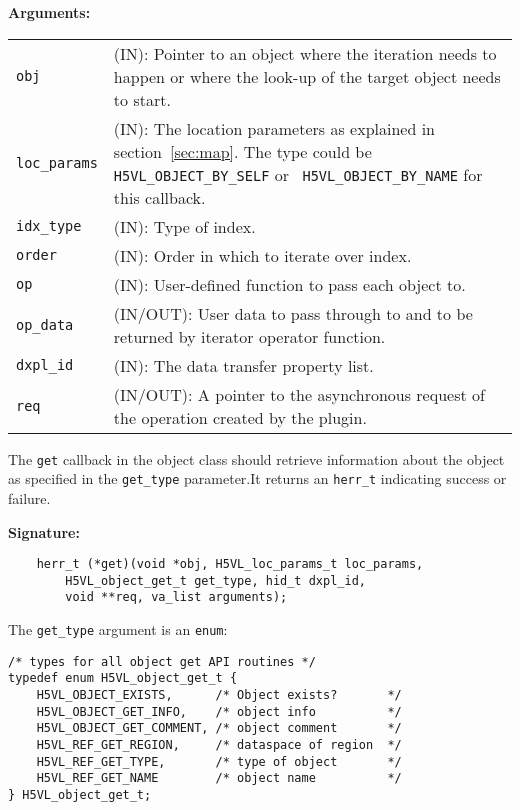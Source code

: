 \textbf{Arguments:}\\
\begin{tabular}{l p{10cm}}
  {\tt obj} & (IN): Pointer to an object where the iteration needs
  to happen or where the look-up of the target object needs to
  start.\\
  {\tt loc\_params} & (IN): The location parameters as
  explained in section~\ref{sec:map}. The type could be {\tt
    H5VL\_OBJECT\_BY\_SELF} or {\tt
    H5VL\_OBJECT\_BY\_NAME} for this callback.\\
  {\tt idx\_type} & (IN): Type of index.\\
  {\tt order} & (IN): Order in which to iterate over index.\\
  {\tt op} & (IN): User-defined function to pass each object to.\\
  {\tt op\_data} & (IN/OUT): User data to pass through to and to be
  returned by iterator operator function. \\
  {\tt dxpl\_id} & (IN): The data transfer property list.\\
  {\tt req} & (IN/OUT): A pointer to the asynchronous request of the
  operation created by the plugin.\\
\end{tabular}

The {\tt get} callback in the object class should retrieve information
about the object as specified in the {\tt get\_type} parameter.It
returns an {\tt herr\_t} indicating success or failure.

\textbf{Signature:}
\begin{lstlisting}
    herr_t (*get)(void *obj, H5VL_loc_params_t loc_params, 
        H5VL_object_get_t get_type, hid_t dxpl_id, 
        void **req, va_list arguments);
\end{lstlisting}

The {\tt get\_type} argument is an {\tt enum}:
\begin{lstlisting}
/* types for all object get API routines */
typedef enum H5VL_object_get_t {
    H5VL_OBJECT_EXISTS,      /* Object exists?       */
    H5VL_OBJECT_GET_INFO,    /* object info          */
    H5VL_OBJECT_GET_COMMENT, /* object comment       */
    H5VL_REF_GET_REGION,     /* dataspace of region  */
    H5VL_REF_GET_TYPE,       /* type of object       */
    H5VL_REF_GET_NAME        /* object name          */
} H5VL_object_get_t;
\end{lstlisting}

